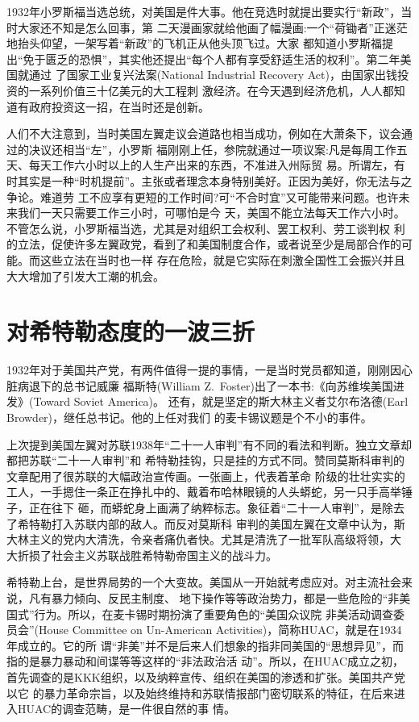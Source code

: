 \documentclass[10pt]{article}
\begin{document}
{1932年小罗斯福当选总统，对美国是件大事。他在竞选时就提出要实行``新政''，当时大家还不知是怎么回事，第
二天漫画家就给他画了幅漫画:一个``荷锄者''正迷茫地抬头仰望，一架写着``新政''的飞机正从他头顶飞过。大家
都知道小罗斯福提出``免于匮乏的恐惧''，其实他还提出``每个人都有享受舒适生活的权利''。第二年美国就通过
了国家工业复兴法案(National Industrial Recovery Act)，由国家出钱投资的一系列价值三十亿美元的大工程刺
激经济。在今天遇到经济危机，人人都知道有政府投资这一招，在当时还是创新。

人们不大注意到，当时美国左翼走议会道路也相当成功，例如在大萧条下，议会通过的决议还相当``左''，小罗斯
福刚刚上任，参院就通过一项议案:凡是每周工作五天、每天工作六小时以上的人生产出来的东西，不准进入州际贸
易。所谓左，有时其实是一种``时机提前''。主张或者理念本身特别美好。正因为美好，你无法与之争论。难道劳
工不应享有更短的工作时间?可``不合时宜''又可能带来问题。也许未来我们一天只需要工作三小时，可哪怕是今
天，美国不能立法每天工作六小时。不管怎么说，小罗斯福当选，尤其是对组织工会权利、罢工权利、劳工谈判权
利的立法，促使许多左翼政党，看到了和美国制度合作，或者说至少是局部合作的可能。而这些立法在当时也一样
存在危险，就是它实际在刺激全国性工会振兴并且大大增加了引发大工潮的机会。

\pagebreak
\section{对希特勒态度的一波三折}

1932年对于美国共产党，有两件值得一提的事情，一是当时党员都知道，刚刚因心脏病退下的总书记威廉
\textperiodcentered 福斯特(William Z.~Foster)出了一本书:《向苏维埃美国进发》(Toward Soviet America)。
还有，就是坚定的斯大林主义者艾尔\textperiodcentered 布洛德(Earl Browder)，继任总书记。他的上任对我们
的麦卡锡议题是个不小的事件。

上次提到美国左翼对苏联1938年``二十一人审判''有不同的看法和判断。独立文章却都把苏联``二十一人审判''和
希特勒挂钩，只是挂的方式不同。赞同莫斯科审判的文章配用了很苏联的大幅政治宣传画。一张画上，代表着革命
阶级的壮壮实实的工人，一手摁住一条正在挣扎中的、戴着布哈林眼镜的人头蟒蛇，另一只手高举锤子，正在往下
砸，而蟒蛇身上画满了纳粹标志。象征着``二十一人审判''，是除去了希特勒打入苏联内部的敌人。而反对莫斯科
审判的美国左翼在文章中认为，斯大林主义的党内大清洗，令亲者痛仇者快。尤其是清洗了一批军队高级将领，大
大折损了社会主义苏联战胜希特勒帝国主义的战斗力。

希特勒上台，是世界局势的一个大变故。美国从一开始就考虑应对。对主流社会来说，凡有暴力倾向、反民主制度、
地下操作等等政治势力，都是一些危险的``非美国式''行为。所以，在麦卡锡时期扮演了重要角色的``美国众议院
非美活动调查委员会''(House Committee on Un-American Activities)，简称HUAC，就是在1934年成立的。它的所
谓``非美''并不是后来人们想象的指非同美国的``思想异见''，而指的是暴力暴动和间谍等等这样的``非法政治活
动''。所以，在HUAC成立之初，首先调查的是KKK组织，以及纳粹宣传、组织在美国的渗透和扩张。美国共产党以它
的暴力革命宗旨，以及始终维持和苏联情报部门密切联系的特征，在后来进入HUAC的调查范畴，是一件很自然的事
情。

}
\end{document}
